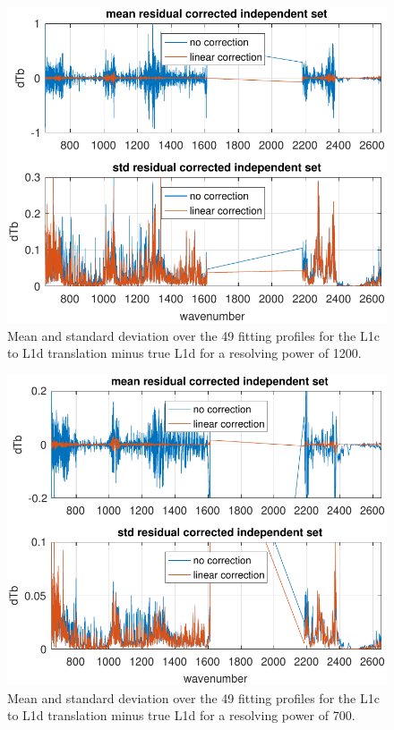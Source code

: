 \documentclass[10pt,twocolumn]{article}
\begin{document}
\begin{figure} %
  \centering
  \includegraphics[width=\linewidth]{figures/L1d_cor1_1200.pdf}
  \caption{Mean and standard deviation over the 49 fitting profiles
    for the L1c to L1d translation minus true L1d for a resolving
    power of 1200.}
  \label{L1d1200}
\end{figure}

\begin{figure} %
  \centering
  \includegraphics[width=\linewidth]{figures/L1d_cor1_700.pdf}
  \caption{Mean and standard deviation over the 49 fitting profiles
    for the L1c to L1d translation minus true L1d for a resolving
    power of 700.}
  \label{L1d700s}
\end{figure}
\end{document}
